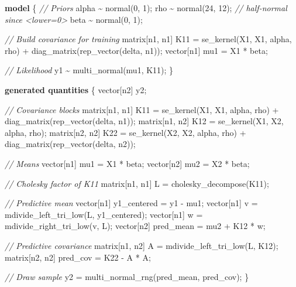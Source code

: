 \documentclass[
]{article}
\newenvironment{Shaded}{\begin{snugshade}}{\end{snugshade}}
\newcommand{\CommentTok}[1]{\textcolor[rgb]{0.56,0.35,0.01}{\textit{#1}}}
\newcommand{\DataTypeTok}[1]{\textcolor[rgb]{0.13,0.29,0.53}{#1}}
\newcommand{\DecValTok}[1]{\textcolor[rgb]{0.00,0.00,0.81}{#1}}
\newcommand{\KeywordTok}[1]{\textcolor[rgb]{0.13,0.29,0.53}{\textbf{#1}}}
\newcommand{\NormalTok}[1]{#1}
\begin{document}
\begin{Shaded}
\begin{Highlighting}[]
\KeywordTok{model}\NormalTok{ \{}
  \CommentTok{// Priors}
\NormalTok{  alpha \textasciitilde{} normal(}\DecValTok{0}\NormalTok{, }\DecValTok{1}\NormalTok{);}
\NormalTok{  rho \textasciitilde{} normal(}\DecValTok{24}\NormalTok{, }\DecValTok{12}\NormalTok{); }\CommentTok{// half{-}normal since \textless{}lower=0\textgreater{}}
\NormalTok{  beta \textasciitilde{} normal(}\DecValTok{0}\NormalTok{, }\DecValTok{1}\NormalTok{);}

  \CommentTok{// Build covariance for training}
  \DataTypeTok{matrix}\NormalTok{[n1, n1] K11 = se\_kernel(X1, X1, alpha, rho)}
\NormalTok{                       + diag\_matrix(rep\_vector(delta, n1));}
  \DataTypeTok{vector}\NormalTok{[n1] mu1 = X1 * beta;}

  \CommentTok{// Likelihood}
\NormalTok{  y1 \textasciitilde{} multi\_normal(mu1, K11);}
\NormalTok{\}}

\KeywordTok{generated quantities}\NormalTok{ \{}
  \DataTypeTok{vector}\NormalTok{[n2] y2;}

  \CommentTok{// Covariance blocks}
  \DataTypeTok{matrix}\NormalTok{[n1, n1] K11 = se\_kernel(X1, X1, alpha, rho)}
\NormalTok{                       + diag\_matrix(rep\_vector(delta, n1));}
  \DataTypeTok{matrix}\NormalTok{[n1, n2] K12 = se\_kernel(X1, X2, alpha, rho);}
  \DataTypeTok{matrix}\NormalTok{[n2, n2] K22 = se\_kernel(X2, X2, alpha, rho)}
\NormalTok{                       + diag\_matrix(rep\_vector(delta, n2));}

  \CommentTok{// Means}
  \DataTypeTok{vector}\NormalTok{[n1] mu1 = X1 * beta;}
  \DataTypeTok{vector}\NormalTok{[n2] mu2 = X2 * beta;}

  \CommentTok{// Cholesky factor of K11}
  \DataTypeTok{matrix}\NormalTok{[n1, n1] L = cholesky\_decompose(K11);}

  \CommentTok{// Predictive mean}
  \DataTypeTok{vector}\NormalTok{[n1] y1\_centered = y1 {-} mu1;}
  \DataTypeTok{vector}\NormalTok{[n1] v = mdivide\_left\_tri\_low(L, y1\_centered);}
  \DataTypeTok{vector}\NormalTok{[n1] w = mdivide\_right\_tri\_low(v\textquotesingle{}, L)\textquotesingle{};}
  \DataTypeTok{vector}\NormalTok{[n2] pred\_mean = mu2 + K12\textquotesingle{} * w;}

  \CommentTok{// Predictive covariance}
  \DataTypeTok{matrix}\NormalTok{[n1, n2] A = mdivide\_left\_tri\_low(L, K12);}
  \DataTypeTok{matrix}\NormalTok{[n2, n2] pred\_cov = K22 {-} A\textquotesingle{} * A;}

  \CommentTok{// Draw sample}
\NormalTok{  y2 = multi\_normal\_rng(pred\_mean, pred\_cov);}
\NormalTok{\}}
\end{Highlighting}
\end{Shaded}
\end{document}

